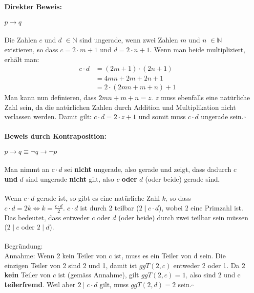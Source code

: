 \documentclass[12pt,a4paper]{article}
\begin{document}
\begin{enumerate}[a)]
\paragraph{Direkter Beweis: } $p\rightarrow q$\\
\\
Die Zahlen $c$ und $d$ $\in\mathbb{N}$ sind ungerade, wenn zwei Zahlen $m$ und $n$ $\in\mathbb{N}$ existieren, so dass $c=2\cdot m +1$ und $d=2\cdot n+1$. Wenn man beide multipliziert, erhält man:
\begin{align*}
c\cdot d &= (2m+1)\cdot(2n+1)\\
&=4mn + 2m + 2n + 1\\
&=2\cdot (2mn + m + n) + 1
\end{align*}
Man kann nun definieren, dass $2mn+m+n=z$. $z$ muss ebenfalls eine natürliche Zahl sein, da die natürlichen Zahlen durch Addition und Multiplikation nicht verlassen werden. Damit gilt: $c\cdot d = 2\cdot z +1$ und somit muss $c\cdot d$ ungerade sein.\hfill$\square$
\paragraph{Beweis durch Kontraposition: } $p\rightarrow q \equiv \neg q \rightarrow \neg p$\\
\\
Man nimmt an $c\cdot d$ sei \textbf{nicht} ungerade, also gerade und zeigt, dass dadurch \glqq $c$ \textbf{und} $d$ sind ungerade\grqq{} \textbf{nicht} gilt, also $c$ \textbf{oder} $d$ (oder beide) gerade sind.\\
\\
Wenn $c\cdot d$ gerade ist, so gibt es eine natürliche Zahl $k$, so dass $c\cdot d = 2k \Leftrightarrow k = \frac{c\cdot d}{2}$. $c\cdot d$ ist durch 2 teilbar ($2\mid c\cdot d$), wobei 2 eine Primzahl ist. Das bedeutet, dass entweder $c$ oder $d$ (oder beide) durch zwei teilbar sein müssen ($2\mid c$ oder $2\mid d$).\\
\\
Begründung: \\
Annahme: Wenn 2 kein Teiler von c ist, muss es ein Teiler von d sein. Die einzigen Teiler von 2 sind 2 und 1, damit ist $ggT(2,c)$ entweder 2 oder 1. Da 2 \textbf{kein} Teiler von $c$ ist (gemäss Annahme), gilt $ggT(2,c)=1$, also sind 2 und c \textbf{teilerfremd}. Weil aber $2\mid c\cdot d$ gilt, muss $ggT(2,d)=2$ sein.\hfill$\square$
\\

\end{enumerate}
\end{document}
